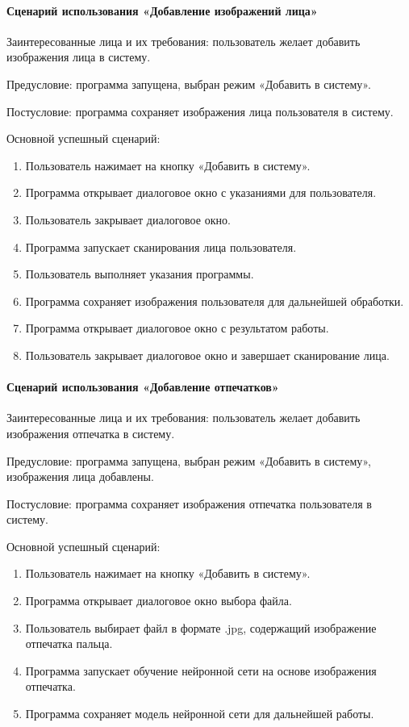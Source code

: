 \paragraph{Сценарий использования «Добавление изображений лица»}

Заинтересованные лица и их требования: пользователь желает добавить изображения лица в систему.

Предусловие: программа запущена, выбран режим «Добавить в систему».

Постусловие: программа сохраняет изображения лица пользователя  в систему.

Основной успешный сценарий:
\begin{enumerate}
	\item Пользователь нажимает на кнопку «Добавить в систему».
	\item Программа открывает диалоговое окно с указаниями для пользователя.
	\item Пользователь закрывает диалоговое окно.
	\item Программа запускает сканирования лица пользователя.
	\item Пользователь выполняет указания программы.
	\item Программа сохраняет изображения пользователя для дальнейшей обработки.
	\item Программа открывает диалоговое окно с результатом работы.
	\item Пользователь закрывает диалоговое окно и завершает сканирование лица.
\end{enumerate}

\paragraph{Сценарий использования «Добавление отпечатков»}

Заинтересованные лица и их требования: пользователь желает добавить изображения отпечатка в систему.

Предусловие: программа запущена, выбран режим «Добавить в систему», изображения лица добавлены.

Постусловие: программа сохраняет изображения отпечатка пользователя в систему.

Основной успешный сценарий:
\begin{enumerate}
	\item Пользователь нажимает на кнопку «Добавить в систему».
	\item Программа открывает диалоговое окно выбора файла.
	\item Пользователь выбирает файл в формате .jpg, содержащий изображение отпечатка пальца.
	\item Программа запускает обучение нейронной сети на основе изображения отпечатка.
	\item Программа сохраняет модель нейронной сети для дальнейшей работы.
\end{enumerate}

